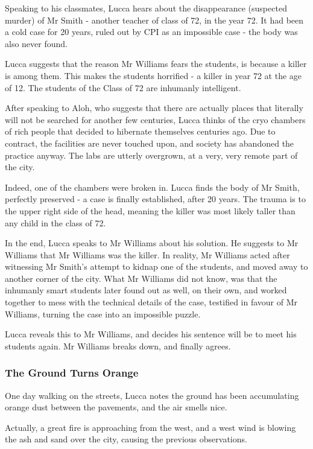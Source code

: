 \documentclass[11pt]{article}
\begin{document}
		Speaking to his classmates, Lucca hears about the disappearance (suspected murder) of Mr Smith - another teacher of class of 72, in the year 72. It had been a cold case for 20 years, ruled out by CPI as an impossible case - the body was also never found.
		
		Lucca suggests that the reason Mr Williams fears the students, is because a killer is among them. This makes the students horrified - a killer in year 72 at the age of 12. The students of the Class of 72 are inhumanly intelligent.
		
		After speaking to Aloh, who suggests that there are actually places that literally will not be searched for another few centuries, Lucca thinks of the cryo chambers of rich people that decided to hibernate themselves centuries ago. Due to contract, the facilities are never touched upon, and society has abandoned the practice anyway. The labs are utterly overgrown, at a very, very remote part of the city.
		
		Indeed, one of the chambers were broken in. Lucca finds the body of Mr Smith, perfectly preserved - a case is finally established, after 20 years. The trauma is to the upper right side of the head, meaning the killer was most likely taller than any child in the class of 72. 
		
		In the end, Lucca speaks to Mr Williams about his solution. 
		He suggests to Mr Williams that Mr Williams was the killer. In reality, Mr Williams acted after witnessing Mr Smith's attempt to kidnap one of the students, and moved away to another corner of the city.
		What Mr Williams did not know, was that the inhumanly smart students later found out as well, on their own, and worked together to mess with the technical details of the case, testified in favour of Mr Williams, turning the case into an impossible puzzle. 
		
		Lucca reveals this to Mr Williams, and decides his sentence will be to meet his students again. Mr Williams breaks down, and finally agrees. 
		
		\subsubsection{The Ground Turns Orange}
		One day walking on the streets, Lucca notes the ground has been accumulating orange dust between the pavements, and the air smells nice. 
		
		Actually, a great fire is approaching from the west, and a west wind is blowing the ash and sand over the city, causing the previous observations. 
		
\end{document}

